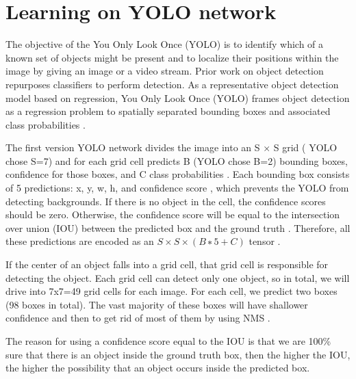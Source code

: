 \section{Learning on YOLO network}

The objective of the You Only Look Once (YOLO) is to identify which of a known set of objects might be present and to localize their positions within the image by giving an image or a video stream. Prior work on object detection repurposes classifiers to perform detection. As a representative object detection model based on regression, You Only Look Once (YOLO) frames object detection as a regression problem to spatially separated bounding boxes and associated class probabilities \cite{yolov1}.

The first version YOLO network divides the image into an S × S grid ( YOLO chose S=7) and for each grid cell predicts B (YOLO chose B=2) bounding boxes, confidence for those boxes, and C class probabilities \cite{yolov1}. Each bounding box consists of 5 predictions: x, y, w, h, and confidence score \cite{yolov1}, which prevents the YOLO from detecting backgrounds.  If there is no object in the cell, the conﬁdence scores should be zero.  Otherwise, the conﬁdence score will be equal to the intersection over union (IOU) between the predicted box and the ground truth \cite{yolov1}. Therefore,  all these predictions are encoded as an $S × S × (B ∗ 5 + C)$ tensor \cite{yolov1}.

If the center of an object falls into a grid cell, that grid cell is responsible for detecting the object. Each grid cell can detect only one object, so in total, we will drive into 7x7=49 grid cells for each image. For each cell, we predict two boxes (98 boxes in total). The vast majority of these boxes will have shallower confidence and then to get rid of most of them by using NMS \cite{yolov1}.

The reason for using a confidence score equal to the IOU is that we are 100\% sure that there is an object inside the ground truth box, then the higher the IOU, the higher the possibility that an object occurs inside the predicted box.




